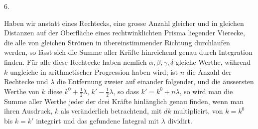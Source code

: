 \clearpage\begingroup
{}
\begin{center}6.\end{center}
\noindent\hspace*{\parindent}Haben wir anstatt eines Rechtecks, eine grosse Anzahl gleicher und in gleichen Distanzen auf der Oberfläche eines rechtwinklichten Prisma liegender Vierecke, die alle von gleichen Strömen in übereinstimmender Richtung durchlaufen werden, so lässt sich die Summe aller Kräfte hinreichend genau durch Integration finden. Für alle diese Rechtecke haben nemlich $\alpha,\beta,\gamma,\delta$ gleiche Werthe, während $k$ ungleiche in arithmetischer Progression haben wird; ist $n$ die Anzahl der Rechtecke und $\lambda$ die Entfernung zweier auf einander folgender, und die äussersten Werthe von $k$ diese $k^0+\frac12\lambda$, $k'-\frac12\lambda$, so dass $k'=k^0+n\lambda$, so wird man die Summe aller Werthe jeder der drei Kräfte hinlänglich genau finden, wenn man ihren Ausdruck, $k$ als veränderlich betrachtend, mit $dk$ multiplicirt, von $k=k^0$ bis $k=k'$ integrirt und das gefundene Integral mit $\lambda$ dividirt.

